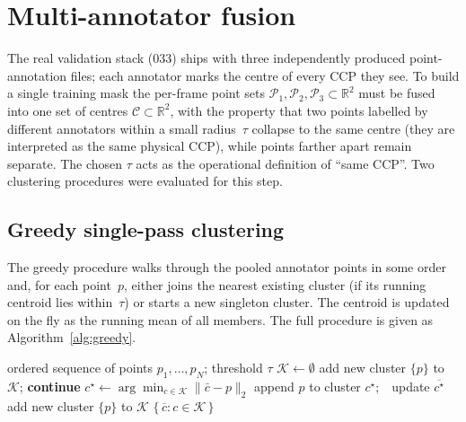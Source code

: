 
\section{Multi-annotator fusion}
\label{sec:annotator-fusion}

The real validation stack (033) ships with three independently produced
point-annotation files; each annotator marks the centre of every CCP they see.
To build a single training mask the per-frame point sets
$\mathcal{P}_1, \mathcal{P}_2, \mathcal{P}_3 \subset \mathbb{R}^2$
must be fused into one set of centres
$\mathcal{C} \subset \mathbb{R}^2$, with the property that two points labelled
by different annotators within a small radius~$\tau$ collapse to the same
centre (they are interpreted as the same physical CCP), while points farther
apart remain separate. The chosen $\tau$ acts as the operational definition
of ``same CCP''. Two clustering procedures were evaluated for this step.

\subsection{Greedy single-pass clustering}
\label{sec:greedy-fusion}

The greedy procedure walks through the pooled annotator points in some order
and, for each point~$p$, either joins the nearest existing cluster (if its
running centroid lies within~$\tau$) or starts a new singleton cluster.
The centroid is updated on the fly as the running mean of all members.
The full procedure is given as Algorithm~\ref{alg:greedy}.

\begin{algorithm}[ht]
\caption{Greedy fusion of per-annotator points}
\label{alg:greedy}
\begin{algorithmic}[1]
\Require ordered sequence of points $p_1, \dots, p_N$; threshold $\tau$
\State $\mathcal{K} \gets \emptyset$ 
    \State add new cluster $\{p\}$ to $\mathcal{K}$; \textbf{continue}
  \EndIf
  \State $c^\star \gets \arg\min_{c \in \mathcal{K}} \lVert \bar{c} - p\rVert_2$
    \State append $p$ to cluster $c^\star$;\ \ update $\overline{c^\star}$
  \Else
    \State add new cluster $\{p\}$ to $\mathcal{K}$
  \EndIf
\EndFor
\State \Return $\{\, \overline{c} : c \in \mathcal{K} \,\}$
\end{algorithmic}
\end{algorithm}

